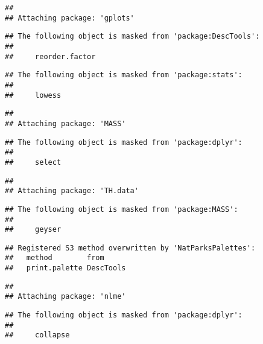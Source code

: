\documentclass[
]{article}
\begin{document}
\begin{verbatim}
## 
## Attaching package: 'gplots'
\end{verbatim}

\begin{verbatim}
## The following object is masked from 'package:DescTools':
## 
##     reorder.factor
\end{verbatim}

\begin{verbatim}
## The following object is masked from 'package:stats':
## 
##     lowess
\end{verbatim}

\begin{verbatim}
## 
## Attaching package: 'MASS'
\end{verbatim}

\begin{verbatim}
## The following object is masked from 'package:dplyr':
## 
##     select
\end{verbatim}

\begin{verbatim}
## 
## Attaching package: 'TH.data'
\end{verbatim}

\begin{verbatim}
## The following object is masked from 'package:MASS':
## 
##     geyser
\end{verbatim}

\begin{verbatim}
## Registered S3 method overwritten by 'NatParksPalettes':
##   method        from     
##   print.palette DescTools
\end{verbatim}

\begin{verbatim}
## 
## Attaching package: 'nlme'
\end{verbatim}

\begin{verbatim}
## The following object is masked from 'package:dplyr':
## 
##     collapse
\end{verbatim}
\end{document}
